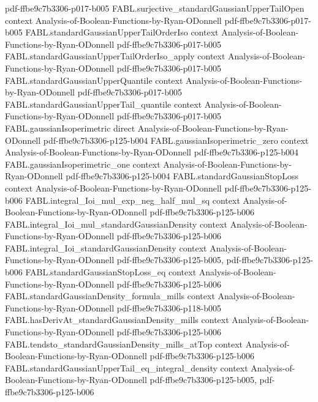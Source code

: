 \begin{theorem}
  {pdf-ffbe9c7b3306-p017-b005}
\proofstep
  {FABL.surjective_standardGaussianUpperTailOpen}
  {context}
  {Analysis-of-Boolean-Functions-by-Ryan-ODonnell}
  {pdf-ffbe9c7b3306-p017-b005}
\proofstep
  {FABL.standardGaussianUpperTailOrderIso}
  {context}
  {Analysis-of-Boolean-Functions-by-Ryan-ODonnell}
  {pdf-ffbe9c7b3306-p017-b005}
\proofstep
  {FABL.standardGaussianUpperTailOrderIso_apply}
  {context}
  {Analysis-of-Boolean-Functions-by-Ryan-ODonnell}
  {pdf-ffbe9c7b3306-p017-b005}
\proofstep
  {FABL.standardGaussianUpperQuantile}
  {context}
  {Analysis-of-Boolean-Functions-by-Ryan-ODonnell}
  {pdf-ffbe9c7b3306-p017-b005}
\proofstep
  {FABL.standardGaussianUpperTail_quantile}
  {context}
  {Analysis-of-Boolean-Functions-by-Ryan-ODonnell}
  {pdf-ffbe9c7b3306-p017-b005}
\proofstep
  {FABL.gaussianIsoperimetric}
  {direct}
  {Analysis-of-Boolean-Functions-by-Ryan-ODonnell}
  {pdf-ffbe9c7b3306-p125-b004}
\proofstep
  {FABL.gaussianIsoperimetric_zero}
  {context}
  {Analysis-of-Boolean-Functions-by-Ryan-ODonnell}
  {pdf-ffbe9c7b3306-p125-b004}
\proofstep
  {FABL.gaussianIsoperimetric_one}
  {context}
  {Analysis-of-Boolean-Functions-by-Ryan-ODonnell}
  {pdf-ffbe9c7b3306-p125-b004}
\proofstep
  {FABL.standardGaussianStopLoss}
  {context}
  {Analysis-of-Boolean-Functions-by-Ryan-ODonnell}
  {pdf-ffbe9c7b3306-p125-b006}
\proofstep
  {FABL.integral_Ioi_mul_exp_neg_half_mul_sq}
  {context}
  {Analysis-of-Boolean-Functions-by-Ryan-ODonnell}
  {pdf-ffbe9c7b3306-p125-b006}
\proofstep
  {FABL.integral_Ioi_mul_standardGaussianDensity}
  {context}
  {Analysis-of-Boolean-Functions-by-Ryan-ODonnell}
  {pdf-ffbe9c7b3306-p125-b006}
\proofstep
  {FABL.integral_Ioi_standardGaussianDensity}
  {context}
  {Analysis-of-Boolean-Functions-by-Ryan-ODonnell}
  {pdf-ffbe9c7b3306-p125-b005,
    pdf-ffbe9c7b3306-p125-b006}
\proofstep
  {FABL.standardGaussianStopLoss_eq}
  {context}
  {Analysis-of-Boolean-Functions-by-Ryan-ODonnell}
  {pdf-ffbe9c7b3306-p125-b006}
\proofstep
  {FABL.standardGaussianDensity_formula_mills}
  {context}
  {Analysis-of-Boolean-Functions-by-Ryan-ODonnell}
  {pdf-ffbe9c7b3306-p118-b005}
\proofstep
  {FABL.hasDerivAt_standardGaussianDensity_mills}
  {context}
  {Analysis-of-Boolean-Functions-by-Ryan-ODonnell}
  {pdf-ffbe9c7b3306-p125-b006}
\proofstep
  {FABL.tendsto_standardGaussianDensity_mills_atTop}
  {context}
  {Analysis-of-Boolean-Functions-by-Ryan-ODonnell}
  {pdf-ffbe9c7b3306-p125-b006}
\proofstep
  {FABL.standardGaussianUpperTail_eq_integral_density}
  {context}
  {Analysis-of-Boolean-Functions-by-Ryan-ODonnell}
  {pdf-ffbe9c7b3306-p125-b005,
    pdf-ffbe9c7b3306-p125-b006}

\end{theorem}
